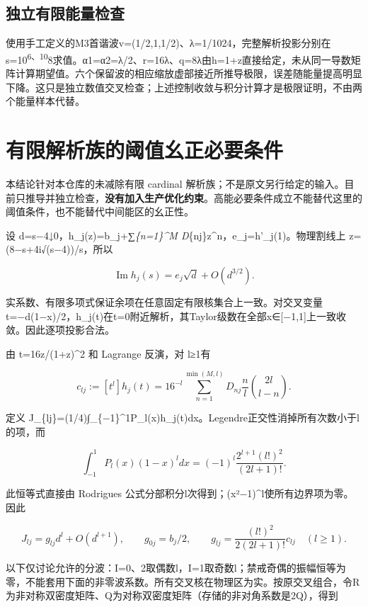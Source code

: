 \documentclass[
  10pt,
  a4paper,
]{article}
\begin{document}
\subsection{独立有限能量检查}\label{ux72ecux7acbux6709ux9650ux80fdux91cfux68c0ux67e5}

使用手工定义的M3首谐波v=(1/2,1,1/2)、λ=1/1024，完整解析投影分别在s=10\textsuperscript{6、10}8求值。α1=α2=λ/2、r=16λ、q=8λ由h=1+z直接给定，未从同一导数矩阵计算期望值。六个保留波的相应缩放虚部接近所推导极限，误差随能量提高明显下降。这只是独立数值交叉检查；上述控制收敛与积分计算才是极限证明，不由两个能量样本代替。

\newpage

\section{有限解析族的阈值幺正必要条件}\label{ux6709ux9650ux89e3ux6790ux65cfux7684ux9608ux503cux5e7aux6b63ux5fc5ux8981ux6761ux4ef6}

本结论针对本仓库的未减除有限 cardinal
解析族；不是原文另行给定的输入。目前只推导并独立检查，\textbf{没有加入生产优化约束}。高能必要条件成立不能替代这里的阈值条件，也不能替代中间能区的幺正性。

设 d=s−4↓0，h\_j(z)=b\_j+∑\emph{\{n=1\}\^{}M
D}\{nj\}z\^{}n，e\_j=h'\_j(1)。物理割线上 z=(8−s+4i√(s−4))/s，所以

\[
\operatorname{Im}h_j(s)=e_j\sqrt d+O(d^{3/2}).
\]

实系数、有限多项式保证余项在任意固定有限核集合上一致。对交叉变量
t=−d(1−x)/2，h\_j(t)在t=0附近解析，其Taylor级数在全部x∈{[}−1,1{]}上一致收敛。因此逐项投影合法。

由 t=16z/(1+z)\^{}2 和 Lagrange 反演，对 l≥1有

\[
c_{lj}:=[t^l]h_j(t)=16^{-l}\sum_{n=1}^{\min(M,l)}D_{nj}\frac nl {2l\choose l-n}.
\]

定义
J\_\{lj\}=(1/4)∫\_\{−1\}\^{}1P\_l(x)h\_j(t)dx。Legendre正交性消掉所有次数小于l的项，而

\[
\int_{-1}^1P_l(x)(1-x)^l dx
=(-1)^l\frac{2^{l+1}(l!)^2}{(2l+1)!}.
\]

此恒等式直接由 Rodrigues
公式分部积分l次得到；(x²−1)\^{}l使所有边界项为零。因此

\[
J_{lj}=g_{lj}d^l+O(d^{l+1}),\qquad
g_{0j}=b_j/2,\qquad
g_{lj}=\frac{(l!)^2}{2(2l+1)!}c_{lj}\quad(l\ge1).
\]

以下仅讨论允许的分波：I=0、2取偶数l，I=1取奇数l；禁戒奇偶的振幅恒等为零，不能套用下面的非零波系数。所有交叉核在物理区为实。按原交叉组合，令R为非对称双密度矩阵、Q为对称双密度矩阵（存储的非对角系数是2Q），得到
\end{document}
